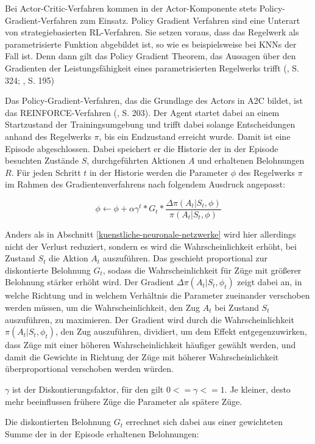 Bei Actor-Critic-Verfahren kommen in der Actor-Komponente stets Policy-Gradient-Verfahren zum Einsatz. Policy Gradient Verfahren sind eine Unterart von strategiebasierten RL-Verfahren. Sie setzen voraus, dass das Regelwerk als parametrisierte Funktion abgebildet ist, so wie es beispielsweise bei KNNs der Fall ist. Denn dann gilt das Policy Gradient Theorem, das Aussagen über den Gradienten der Leistungsfähigkeit eines parametrisierten Regelwerks trifft (\cite{Sutton.2018}, S. 324; \cite{Albrecht.2024}, S. 195)

Das Policy-Gradient-Verfahren, das die Grundlage des Actors in A2C bildet, ist das REINFORCE-Verfahren (\cite{Albrecht.2024}, S. 203). Der Agent startet dabei an einem Startzustand der Trainingsumgebung und trifft dabei solange Entscheidungen anhand des Regelwerks $\pi$, bis ein Endzustand erreicht wurde. Damit ist eine Episode abgeschlossen. Dabei speichert er die Historie der in der Episode besuchten Zustände $S$, durchgeführten Aktionen $A$ und erhaltenen Belohnungen $R$. Für jeden Schritt $t$ in der Historie werden die Parameter $\phi$ des Regelwerks $\pi$ im Rahmen des Gradientenverfahrens nach folgendem Ausdruck angepasst:

\[ \phi \leftarrow \phi {+} \alpha \gamma ^{t} * G_t * \frac{\Delta \pi (A_t|S_t, \phi)}{\pi (A_t|S_t, \phi)} \]

Anders als in Abschnitt \ref{kuenstliche-neuronale-netzwerke} wird hier allerdings nicht der Verlust reduziert, sondern es wird die Wahrscheinlichkeit erhöht, bei Zustand $S_t$ die Aktion $A_t$ auszuführen. Das geschieht proportional zur diskontierte Belohnung $G_t$, sodass die Wahrscheinlichkeit für Züge mit größerer Belohnung stärker erhöht wird. Der Gradient $\Delta \pi (A_t|S_t, \phi_t)$ zeigt dabei an, in welche Richtung und in welchem Verhältnis die Parameter zueinander verschoben werden müssen, um die Wahrscheinlichkeit, den Zug $A_t$ bei Zustand $S_t$ auszuführen, zu maximieren. Der Gradient wird durch die Wahrscheinlichkeit $\pi (A_t|S_t, \phi_t)$, den Zug auszuführen, dividiert, um dem Effekt entgegenzuwirken, dass Züge mit einer höheren Wahrscheinlichkeit häufiger gewählt werden, und damit die Gewichte in Richtung der Züge mit höherer Wahrscheinlichkeit überproportional verschoben werden würden.

$\gamma$ ist der Diskontierungsfaktor, für den gilt $0 <= \gamma <= 1$. Je kleiner, desto mehr beeinflussen frühere Züge die Parameter als spätere Züge.

Die diskontierten Belohnung $G_t$ errechnet sich dabei aus einer gewichteten Summe der in der Episode erhaltenen Belohnungen:

